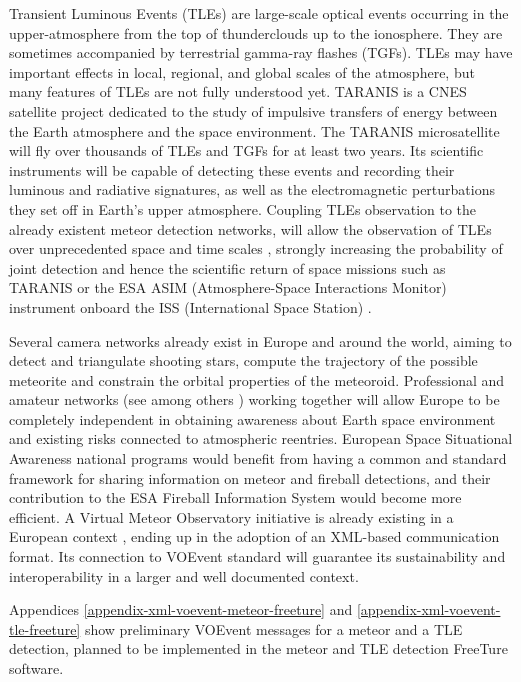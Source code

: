 \documentclass[referee,a4paper,12pt,traditabstract]{swsc}
\begin{document}
\begin{linenumbers}
Transient Luminous Events (TLEs) \cite{Pasko2012}  are large-scale optical events occurring in the upper-atmosphere from the top of thunderclouds up to the ionosphere. They are sometimes accompanied by terrestrial gamma-ray flashes (TGFs). TLEs may have important effects in local, regional, and global scales of the atmosphere, but many features of TLEs are not fully understood yet. TARANIS is a CNES satellite project dedicated to the study of impulsive transfers of energy between the Earth atmosphere and the space environment. The TARANIS microsatellite will fly over thousands of TLEs and TGFs for at least two years. Its scientific instruments will be capable of detecting these events and recording their luminous and radiative signatures, as well as the electromagnetic perturbations they set off in Earth's upper atmosphere. Coupling TLEs observation to the already existent meteor detection networks, will allow the observation of TLEs over unprecedented space and time scales \cite{2017AGUFMAE23A2469G}, strongly increasing the probability of joint detection and hence the scientific return of space missions such as TARANIS or the ESA ASIM (Atmosphere-Space Interactions Monitor) instrument onboard the ISS (International Space Station) \cite{2009AIPC.1118....8N}.

Several camera networks already exist in Europe and around the world, aiming to detect and triangulate shooting stars, compute the trajectory of the possible meteorite and constrain the orbital properties of the meteoroid. Professional and amateur networks (see among others \cite{1998M&PS...33...49O,  2013pimo.conf..125J, 2015EPSC...10..800C, 2016pimo.conf...76G}) working together will allow Europe to be completely independent in obtaining awareness about Earth space environment and existing risks connected to atmospheric reentries. European Space Situational Awareness national programs would benefit from having a common and standard framework for sharing information on meteor and fireball detections, and their contribution to the ESA Fireball Information System would become more efficient. A Virtual Meteor Observatory initiative is already existing in a European context \cite{2008EM&P..102..247K, 2010JIMO...38...10B}, ending up in the adoption of an XML-based communication format. Its connection to VOEvent standard will guarantee its sustainability and interoperability in a larger and well documented context.



Appendices \ref{appendix-xml-voevent-meteor-freeture} and \ref{appendix-xml-voevent-tle-freeture} show preliminary VOEvent messages for a meteor and a TLE detection, planned to be implemented in the meteor and TLE detection FreeTure \cite{2014pim4.conf...39A} software. 


\end{linenumbers}
\end{document}
